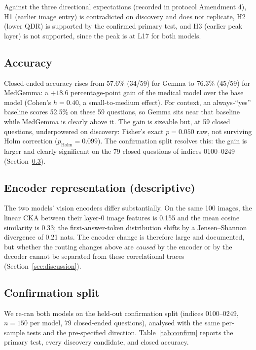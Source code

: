 Against the three directional expectations (recorded in protocol Amendment 4), H1 (earlier image entry) is contradicted
on discovery and does not replicate, H2 (lower QDR) is supported by the confirmed
primary test, and H3 (earlier peak layer) is not supported, since the peak is at L17
for both models.

\subsection{Accuracy}

Closed-ended accuracy rises from 57.6\% (34/59) for Gemma to 76.3\% (45/59) for
MedGemma: a $+18.6$ percentage-point gain of the medical model over the base model
(Cohen's $h{=}0.40$, a small-to-medium effect). For context, an always-``yes'' baseline
scores 52.5\% on these 59 questions, so Gemma sits near that baseline while MedGemma is clearly
above it. The gain is sizeable but, at 59 closed questions, underpowered on discovery:
Fisher's exact $p{=}0.050$ raw, not surviving Holm correction ($p_\text{Holm}{=}0.099$).
The confirmation split resolves this: the gain is larger and clearly significant on the
79 closed questions of indices 0100--0249 (Section~\ref{sec:confirmation}).

\subsection{Encoder representation (descriptive)}

The two models' vision encoders differ substantially. On the same 100 images, the
linear CKA between their layer-0 image features is 0.155 and the mean cosine
similarity is 0.33; the first-answer-token distribution shifts by a Jensen--Shannon
divergence of 0.21 nats. The encoder change is therefore large and documented, but
whether the routing changes above are \emph{caused} by the encoder or by the decoder
cannot be separated from these correlational traces (Section~\ref{sec:discussion}).

\subsection{Confirmation split}
\label{sec:confirmation}

We re-ran both models on the held-out confirmation split (indices 0100--0249,
$n{=}150$ per model, 79 closed-ended questions), analysed with the same per-sample
tests and the pre-specified direction. Table~\ref{tab:confirm} reports the primary
test, every discovery candidate, and closed accuracy.

